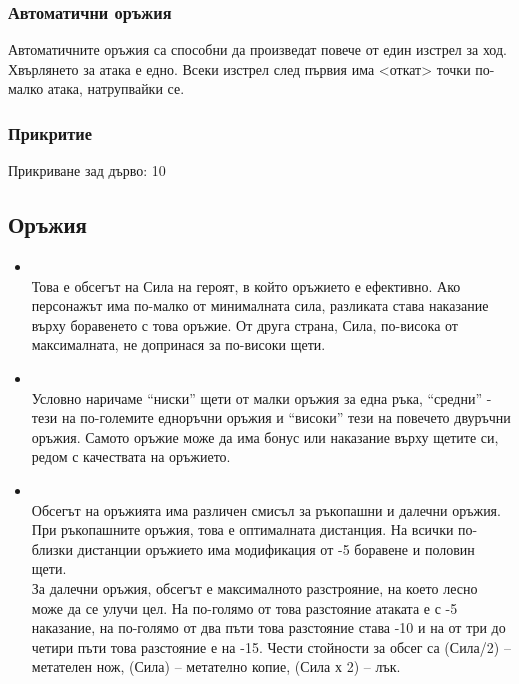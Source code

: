 \subsubsection{Автоматични оръжия}
Автоматичните оръжия са способни да произведат повече от един изстрел за ход.
Хвърлянето за атака е едно.
Всеки изстрел след първия има <откат> точки по-малко атака, натрупвайки се.
\subsubsection{Прикритие}
Прикриване зад дърво: 10

\subsection{Оръжия}
\begin{itemize}
\item {} \\
Това е обсегът на Сила на героят, в който оръжието е ефективно.
Ако персонажът има по-малко от минималната сила, разликата става наказание върху боравенето с това оръжие.
От друга страна, Сила, по-висока от максималната, не допринася за по-високи щети.
\item {} \\
Условно наричаме “ниски” щети от малки оръжия за една ръка, “средни” - тези на по-големите
едноръчни оръжия и “високи” тези на повечето двуръчни оръжия.
Самото оръжие може да има бонус или наказание върху щетите си, редом с качествата на оръжието.
\item {} \\
Обсегът на оръжията има различен смисъл за ръкопашни и далечни оръжия.
При ръкопашните оръжия, това е оптималната дистанция.
На всички по-близки дистанции оръжието има модификация от -5 боравене и половин щети.
\\
За далечни оръжия, обсегът е максималното разстрояние, на което лесно може да се улучи цел.
На по-голямо от това разстояние атаката е с -5 наказание, на по-голямо от два пъти това разстояние става -10 и на от три до четири пъти това разстояние е на -15.
Чести стойности за обсег са (Сила/2) – метателен нож, (Сила) – метателно копие, (Сила х 2) – лък.
\end{itemize}

